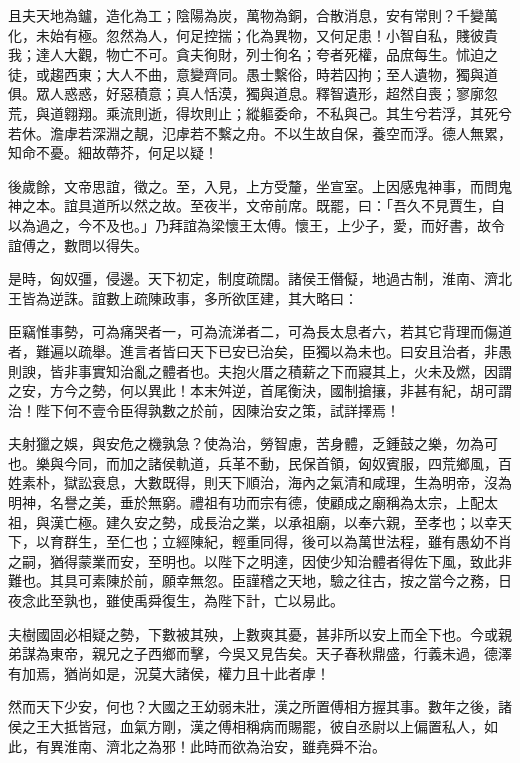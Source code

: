 \begin{pinyinscope}
且夫天地為鑪，造化為工；陰陽為炭，萬物為銅，合散消息，安有常則？千變萬化，未始有極。忽然為人，何足控揣；化為異物，又何足患！小智自私，賤彼貴我；達人大觀，物亡不可。貪夫徇財，列士徇名；夸者死權，品庶每生。怵迫之徒，或趨西東；大人不曲，意變齊同。愚士繫俗，時若囚拘；至人遺物，獨與道俱。眾人惑惑，好惡積意；真人恬漠，獨與道息。釋智遺形，超然自喪；寥廓忽荒，與道翱翔。乘流則逝，得坎則止；縱軀委命，不私與己。其生兮若浮，其死兮若休。澹虖若深淵之靚，氾虖若不繫之舟。不以生故自保，養空而浮。德人無累，知命不憂。細故蔕芥，何足以疑！

後歲餘，文帝思誼，徵之。至，入見，上方受釐，坐宣室。上因感鬼神事，而問鬼神之本。誼具道所以然之故。至夜半，文帝前席。既罷，曰：「吾久不見賈生，自以為過之，今不及也。」乃拜誼為梁懷王太傅。懷王，上少子，愛，而好書，故令誼傅之，數問以得失。

是時，匈奴彊，侵邊。天下初定，制度疏闊。諸侯王僭儗，地過古制，淮南、濟北王皆為逆誅。誼數上疏陳政事，多所欲匡建，其大略曰：

臣竊惟事勢，可為痛哭者一，可為流涕者二，可為長太息者六，若其它背理而傷道者，難遍以疏舉。進言者皆曰天下已安已治矣，臣獨以為未也。曰安且治者，非愚則諛，皆非事實知治亂之體者也。夫抱火厝之積薪之下而寢其上，火未及燃，因謂之安，方今之勢，何以異此！本末舛逆，首尾衡決，國制搶攘，非甚有紀，胡可謂治！陛下何不壹令臣得孰數之於前，因陳治安之策，試詳擇焉！

夫射獵之娛，與安危之機孰急？使為治，勞智慮，苦身體，乏鍾鼓之樂，勿為可也。樂與今同，而加之諸侯軌道，兵革不動，民保首領，匈奴賓服，四荒鄉風，百姓素朴，獄訟衰息，大數既得，則天下順治，海內之氣清和咸理，生為明帝，沒為明神，名譽之美，垂於無窮。禮祖有功而宗有德，使顧成之廟稱為太宗，上配太祖，與漢亡極。建久安之勢，成長治之業，以承祖廟，以奉六親，至孝也；以幸天下，以育群生，至仁也；立經陳紀，輕重同得，後可以為萬世法程，雖有愚幼不肖之嗣，猶得蒙業而安，至明也。以陛下之明達，因使少知治體者得佐下風，致此非難也。其具可素陳於前，願幸無忽。臣謹稽之天地，驗之往古，按之當今之務，日夜念此至孰也，雖使禹舜復生，為陛下計，亡以易此。

夫樹國固必相疑之勢，下數被其殃，上數爽其憂，甚非所以安上而全下也。今或親弟謀為東帝，親兄之子西鄉而擊，今吳又見告矣。天子春秋鼎盛，行義未過，德澤有加焉，猶尚如是，況莫大諸侯，權力且十此者虖！

然而天下少安，何也？大國之王幼弱未壯，漢之所置傅相方握其事。數年之後，諸侯之王大抵皆冠，血氣方剛，漢之傅相稱病而賜罷，彼自丞尉以上偏置私人，如此，有異淮南、濟北之為邪！此時而欲為治安，雖堯舜不治。


\end{pinyinscope}

